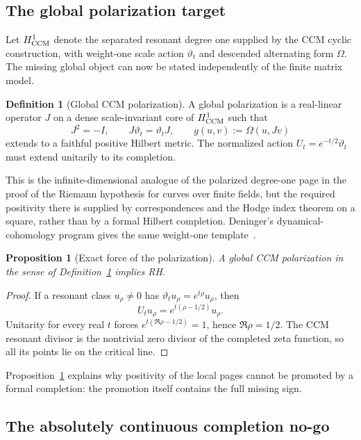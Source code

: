 \documentclass[11pt]{amsart}
\newtheorem{proposition}[theorem]{Proposition}
\theoremstyle{definition}
\newtheorem{definition}[theorem]{Definition}
\theoremstyle{remark}
\begin{document}
\subsection{The global polarization target}

Let \(H^1_{\rm CCM}\) denote the separated resonant degree one supplied by
the CCM cyclic construction, with weight-one scale action
\(\vartheta_t\) and descended alternating form \(\Omega\).  The missing
global object can now be stated independently of the finite matrix model.

\begin{definition}[Global CCM polarization]
\label{def:global-polarization}
A global polarization is a real-linear operator \(J\) on a dense
scale-invariant core of \(H^1_{\rm CCM}\) such that
\[
 J^2=-I,
 \qquad
 J\vartheta_t=\vartheta_tJ,
 \qquad
 g(u,v):=\Omega(u,Jv)
 \tag{10.30}
\]
extends to a faithful positive Hilbert metric.  The normalized action
\(U_t=e^{-t/2}\vartheta_t\) must extend unitarily to its completion.
\end{definition}

This is the infinite-dimensional analogue of the polarized degree-one
page in the proof of the Riemann hypothesis for curves over finite fields,
but the required positivity there is supplied by correspondences and the
Hodge index theorem on a square, rather than by a formal Hilbert
completion.  Deninger's dynamical-cohomology program gives the same
weight-one template~\cite{Deninger1998}.

\begin{proposition}[Exact force of the polarization]
\label{prop:polarization-rh}
A global CCM polarization in the sense of
Definition~\ref{def:global-polarization} implies RH.
\end{proposition}

\begin{proof}
If a resonant class \(u_\rho\ne0\) has
\(\vartheta_tu_\rho=e^{t\rho}u_\rho\), then
\[
 U_tu_\rho=e^{t(\rho-1/2)}u_\rho.
\]
Unitarity for every real \(t\) forces
\(e^{t(\Re\rho-1/2)}=1\), hence \(\Re\rho=1/2\).  The CCM resonant
divisor is the nontrivial zero divisor of the completed zeta function, so
all its points lie on the critical line.
\end{proof}

Proposition~\ref{prop:polarization-rh} explains why positivity of the local
pages cannot be promoted by a formal completion: the promotion itself
contains the full missing sign.

\subsection{The absolutely continuous completion no-go}
\end{document}
